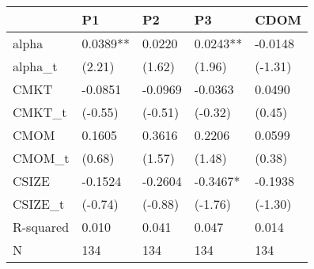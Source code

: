 \begin{tabular}{lllll}
\toprule
 & P1 & P2 & P3 & CDOM \\
\midrule
alpha & 0.0389** & 0.0220 & 0.0243** & -0.0148 \\
alpha_t & (2.21) & (1.62) & (1.96) & (-1.31) \\
CMKT & -0.0851 & -0.0969 & -0.0363 & 0.0490 \\
CMKT_t & (-0.55) & (-0.51) & (-0.32) & (0.45) \\
CMOM & 0.1605 & 0.3616 & 0.2206 & 0.0599 \\
CMOM_t & (0.68) & (1.57) & (1.48) & (0.38) \\
CSIZE & -0.1524 & -0.2604 & -0.3467* & -0.1938 \\
CSIZE_t & (-0.74) & (-0.88) & (-1.76) & (-1.30) \\
R-squared & 0.010 & 0.041 & 0.047 & 0.014 \\
N & 134 & 134 & 134 & 134 \\
\bottomrule
\end{tabular}
